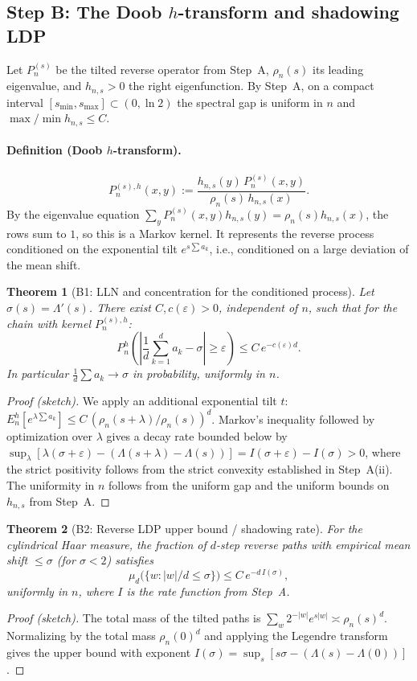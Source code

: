 \documentclass[12pt,a4paper]{article}
\newtheorem{theorem}{Theorem}[section]
\begin{document}
\subsection{Step B: The Doob $h$-transform and shadowing LDP}
\label{subsec:step_b}

Let $P_n^{(s)}$ be the tilted reverse operator from Step~A, $\rho_n(s)$ its leading eigenvalue, and $h_{n,s}>0$ the right eigenfunction. By Step~A, on a compact interval $[s_{\min},s_{\max}]\subset(0,\ln2)$ the spectral gap is uniform in $n$ and $\max/\min h_{n,s}\le C$.

\paragraph{Definition (Doob $h$-transform).}
\[
P_n^{(s),h}(x,y):=\frac{h_{n,s}(y)\,P_n^{(s)}(x,y)}{\rho_n(s)\,h_{n,s}(x)}.
\]
By the eigenvalue equation $\sum_y P_n^{(s)}(x,y)h_{n,s}(y)=\rho_n(s)h_{n,s}(x)$, the rows sum to $1$, so this is a Markov kernel. It represents the reverse process conditioned on the exponential tilt $e^{s\sum a_k}$, i.e., conditioned on a large deviation of the mean shift.

\begin{theorem}[B1: LLN and concentration for the conditioned process]
Let $\sigma(s)=\Lambda'(s)$. There exist $C,c(\varepsilon)>0$, independent of $n$, such that for the chain with kernel $P_n^{(s),h}$:
\[
P_n^{h}\left(\left|\frac1d\sum_{k=1}^d a_k-\sigma\right|\ge\varepsilon\right)\le C\,e^{-c(\varepsilon)d}.
\]
In particular $\frac1d\sum a_k\to\sigma$ in probability, uniformly in $n$.
\end{theorem}
\begin{proof}[Proof (sketch)]
We apply an additional exponential tilt $t$: $E_n^{h}[e^{\lambda\sum a_k}]\le C\,(\rho_n(s+\lambda)/\rho_n(s))^d$. Markov's inequality followed by optimization over $\lambda$ gives a decay rate bounded below by $\sup_\lambda[\lambda(\sigma+\varepsilon)-(\Lambda(s+\lambda)-\Lambda(s))]=I(\sigma+\varepsilon)-I(\sigma)>0$, where the strict positivity follows from the strict convexity established in Step~A(ii). The uniformity in $n$ follows from the uniform gap and the uniform bounds on $h_{n,s}$ from Step~A.
\end{proof}

\begin{theorem}[B2: Reverse LDP upper bound / shadowing rate]
For the cylindrical Haar measure, the fraction of $d$-step reverse paths with empirical mean shift $\le\sigma$ (for $\sigma<2$) satisfies
\[
\mu_d\big(\{w : |w|/d\le\sigma\}\big)\le C\,e^{-d\,I(\sigma)},
\]
uniformly in $n$, where $I$ is the rate function from Step~A.
\end{theorem}
\begin{proof}[Proof (sketch)]
The total mass of the tilted paths is $\sum_{w}2^{-|w|}e^{s|w|}\asymp\rho_n(s)^d$. Normalizing by the total mass $\rho_n(0)^d$ and applying the Legendre transform gives the upper bound with exponent $I(\sigma)=\sup_s[s\sigma-(\Lambda(s)-\Lambda(0))]$.
\end{proof}
\end{document}
